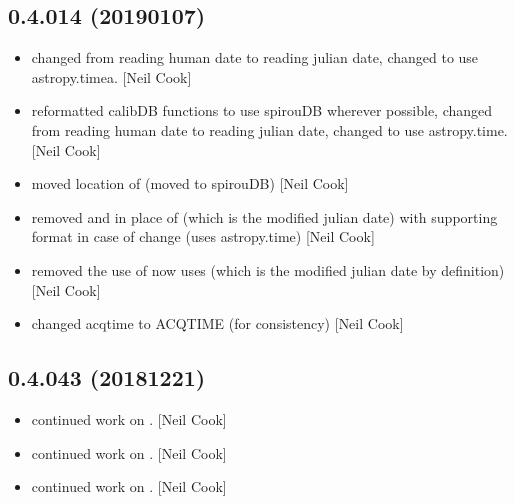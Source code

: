 \documentclass[a4paper,10pt,english]{report}
\begin{document}
\subsection{0.4.014 (2019\sphinxhyphen{}01\sphinxhyphen{}07)}
\label{\detokenize{misc/changelog:id242}}\begin{itemize}
\item {} 
 \sphinxhyphen{} changed from reading human date to reading julian date,
changed to use astropy.timea. {[}Neil Cook{]}

\item {} 
 \sphinxhyphen{} reformatted calibDB functions to use spirouDB wherever
possible, changed from reading human date to reading julian date,
changed to use astropy.time. {[}Neil Cook{]}

\item {} 
 \sphinxhyphen{} moved location of  (moved to
spirouDB) {[}Neil Cook{]}

\item {} 
 \sphinxhyphen{} removed  and  in
place of  (which is the modified julian date) \sphinxhyphen{} with
supporting format in case of change (uses astropy.time) {[}Neil Cook{]}

\item {} 
 \sphinxhyphen{} removed the use of  now uses
 (which is the modified julian date by definition) {[}Neil
Cook{]}

\item {} 
 \sphinxhyphen{} changed acqtime to ACQTIME (for
consistency) {[}Neil Cook{]}

\end{itemize}


\subsection{0.4.043 (2018\sphinxhyphen{}12\sphinxhyphen{}21)}
\label{\detokenize{misc/changelog:id243}}\begin{itemize}
\item {} 
 \sphinxhyphen{} continued work on . {[}Neil Cook{]}

\item {} 
 \sphinxhyphen{} continued work on . {[}Neil Cook{]}

\item {} 
 \sphinxhyphen{} continued work on . {[}Neil Cook{]}

\end{itemize}
\end{document}
